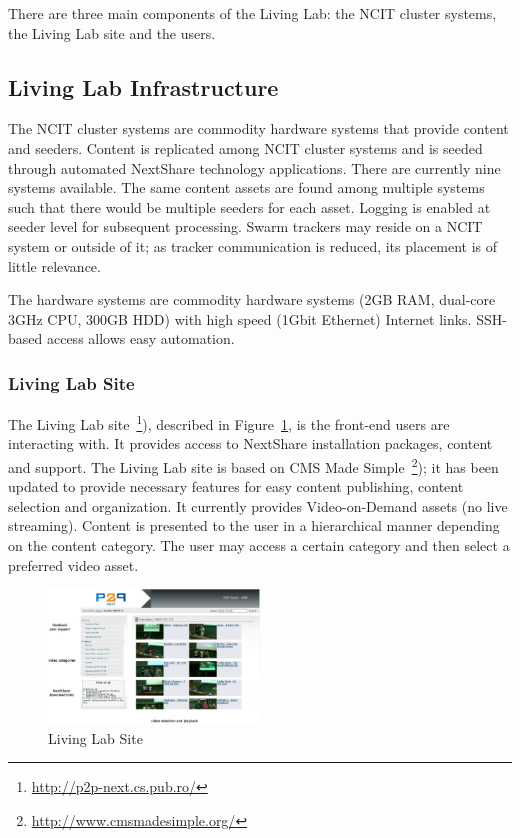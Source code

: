 There are three main components of the Living Lab: the NCIT cluster
systems, the Living Lab site and the users.

\subsection{Living Lab Infrastructure}
\label{subsec:multimedia-dist:evaluation-infrastructure}

The NCIT cluster systems are commodity hardware systems that provide content
and seeders. Content is replicated among NCIT cluster systems and is seeded
through automated NextShare technology applications. There are currently nine
systems available. The same content assets are found among multiple systems
such that there would be multiple seeders for each asset. Logging is enabled
at seeder level for subsequent processing. Swarm trackers may reside on a NCIT
system or outside of it; as tracker communication is reduced, its placement is
of little relevance.

The hardware systems are commodity hardware systems (2GB RAM, dual-core 3GHz
CPU, 300GB HDD) with high speed (1Gbit Ethernet) Internet links. SSH-based
access allows easy automation.

\subsubsection{Living Lab Site}

The Living Lab site~\footnote{\url{http://p2p-next.cs.pub.ro/}}), described in
Figure~\ref{fig:multimedia-dist:upb-living-lab-site}, is
the front-end users are interacting with. It provides access to NextShare
installation packages, content and support. The Living Lab site is based on
CMS Made Simple~\footnote{\url{http://www.cmsmadesimple.org/}}); it has been updated to
provide necessary features for easy content publishing, content selection and
organization. It currently provides Video-on-Demand assets (no live
streaming). Content is presented to the user in a hierarchical manner
depending on the content category. The user may access a certain
category and then select a preferred video asset.

\begin{figure}
  \centering
  \includegraphics[width=0.5\textwidth]{src/img/multimedia-dist/upb-living-lab-site}
  \caption{Living Lab Site}
  \label{fig:multimedia-dist:upb-living-lab-site}
\end{figure}

